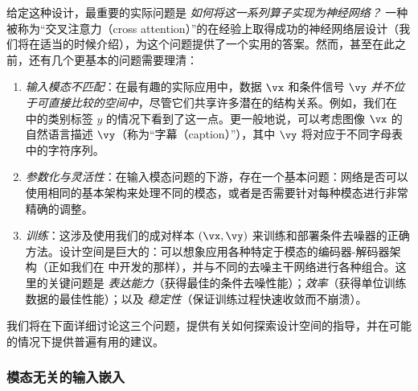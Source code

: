 \documentclass[../../book-main_zh.tex]{subfiles}
\begin{document}
给定这种设计，最重要的实际问题是 \textit{如何将这一系列算子实现为神经网络？}
一种被称为“交叉注意力（cross attention）”的在经验上取得成功的神经网络层设计（我们将在适当的时候介绍），为这个问题提供了一个实用的答案。然而，甚至在此之前，还有几个更基本的问题需要理清：
\begin{enumerate}
    \item \textit{输入模态不匹配}：在最有趣的实际应用中，数据 $\vx$ 和条件信号 $\vy$ \textit{并不位于可直接比较的空间中}，尽管它们共享许多潜在的结构关系。例如，我们在  中的类别标签 $y$ 的情况下看到了这一点。更一般地说，可以考虑图像 $\vx$ 的自然语言描述 $\vy$（称为“字幕（caption）”），其中 $\vy$ 将对应于不同字母表中的字符序列。
    \item \textit{参数化与灵活性}：在输入模态问题的下游，存在一个基本问题：网络是否可以使用相同的基本架构来处理不同的模态，或者是否需要针对每种模态进行非常精确的调整。
    \item \textit{训练}：这涉及使用我们的成对样本 $(\vx, \vy)$ 来训练和部署条件去噪器的正确方法。设计空间是巨大的：可以想象应用各种特定于模态的编码器-解码器架构（正如我们在  中开发的那样），并与不同的去噪主干网络进行各种组合。这里的关键问题是 \textit{表达能力}（获得最佳的条件去噪性能）；\textit{效率}（获得单位训练数据的最佳性能）；以及 \textit{稳定性}（保证训练过程快速收敛而不崩溃）。
\end{enumerate}

我们将在下面详细讨论这三个问题，提供有关如何探索设计空间的指导，并在可能的情况下提供普遍有用的建议。

\subsubsection{模态无关的输入嵌入}



\end{document}
